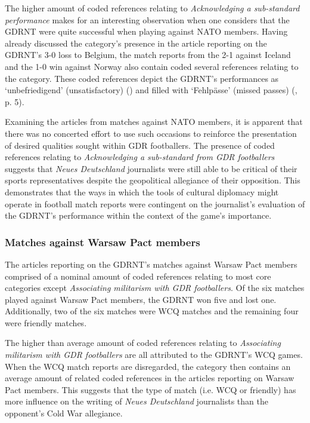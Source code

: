 The higher amount of coded references relating to \textit{Acknowledging a sub-standard performance} makes for an interesting observation when one considers that the GDRNT were quite successful when playing against NATO members. Having already discussed the category’s presence in the article reporting on the GDRNT’s 3-0 loss to Belgium, the match reports from the 2-1 against Iceland and the 1-0 win against Norway also contain coded several references relating to the category. These coded references depict the GDRNT’s performances as ‘unbefriedigend’ (unsatisfactory) (\cite{nd19740524}) and filled with ‘Fehlpässe’ (missed passes) (\cite{nd19730719}, p. 5).

Examining the articles from matches against NATO members, it is apparent that there was no concerted effort to use such occasions to reinforce the presentation of desired qualities sought within GDR footballers. The presence of coded references relating to \textit{Acknowledging a sub-standard from GDR footballers} suggests that \textit{Neues Deutschland} journalists were still able to be critical of their sports representatives despite the geopolitical allegiance of their opposition. This demonstrates that the ways in which the tools of cultural diplomacy might operate in football match reports were contingent on the journalist’s evaluation of the GDRNT’s performance within the context of the game’s importance.

\subsubsection*{Matches against Warsaw Pact members}

The articles reporting on the GDRNT’s matches against Warsaw Pact members comprised of a nominal amount of coded references relating to most core categories except \textit{Associating militarism with GDR footballers}. Of the six matches played against Warsaw Pact members, the GDRNT won five and lost one. Additionally, two of the six matches were WCQ matches and the remaining four were friendly matches.

The higher than average amount of coded references relating to \textit{Associating militarism with GDR footballers} are all attributed to the GDRNT’s WCQ games. When the WCQ match reports are disregarded, the category then contains an average amount of related coded references in the articles reporting on Warsaw Pact members. This suggests that the type of match (i.e. WCQ or friendly) has more influence on the writing of \textit{Neues Deutschland} journalists than the opponent’s Cold War allegiance.

